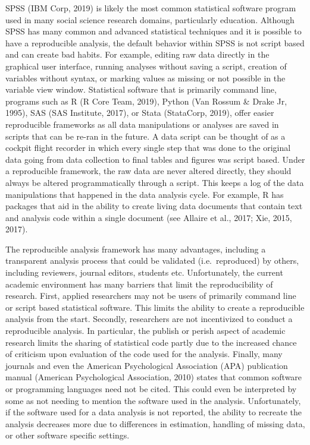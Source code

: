 \documentclass[english,,man]{apa6}
\begin{document}
SPSS (IBM Corp, 2019) is likely the most common statistical software program used in many social science research domains, particularly education. Although SPSS has many common and advanced statistical techniques and it is possible to have a reproducible analysis, the default behavior within SPSS is not script based and can create bad habits. For example, editing raw data directly in the graphical user interface, running analyses without saving a script, creation of variables without syntax, or marking values as missing or not possible in the variable view window. Statistical software that is primarily command line, programs such as R (R Core Team, 2019), Python (Van Rossum \& Drake Jr, 1995), SAS (SAS Institute, 2017), or Stata (StataCorp, 2019), offer easier reproducible frameworks as all data manipulations or analyses are saved in scripts that can be re-ran in the future. A data script can be thought of as a cockpit flight recorder in which every single step that was done to the original data going from data collection to final tables and figures was script based. Under a reproducible framework, the raw data are never altered directly, they should always be altered programmatically through a script. This keeps a log of the data manipulations that happened in the data analysis cycle. For example, R has packages that aid in the ability to create living data documents that contain text and analysis code within a single document (see Allaire et al., 2017; Xie, 2015, 2017).

The reproducible analysis framework has many advantages, including a transparent analysis process that could be validated (i.e.~reproduced) by others, including reviewers, journal editors, students etc. Unfortunately, the current academic environment has many barriers that limit the reproducibility of research. First, applied researchers may not be users of primarily command line or script based statistical software. This limits the ability to create a reproducible analysis from the start. Secondly, researchers are not incentivized to conduct a reproducible analysis. In particular, the publish or perish aspect of academic research limits the sharing of statistical code partly due to the increased chance of criticism upon evaluation of the code used for the analysis. Finally, many journals and even the American Psychological Association (APA) publication manual (American Psychological Association, 2010) states that common software or programming languages need not be cited. This could even be interpreted by some as not needing to mention the software used in the analysis. Unfortunately, if the software used for a data analysis is not reported, the ability to recreate the analysis decreases more due to differences in estimation, handling of missing data, or other software specific settings.
\end{document}
